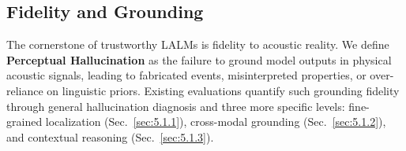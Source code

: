 \documentclass{llmxive}
\begin{document}


\subsection{Fidelity and Grounding}
\label{sec:5.1}

The cornerstone of trustworthy LALMs is fidelity to acoustic reality. We define \textbf{Perceptual Hallucination} as the failure to ground model outputs \cite{cheng2026aha, nwulist2026aabench, nwulist2026speechjailbreaker, zhao2026halluaudiocomprehensivebenchmarkhallucination} in physical acoustic signals, leading to fabricated events, misinterpreted properties, or over-reliance on linguistic priors. Existing evaluations quantify such grounding fidelity through general hallucination diagnosis and three more specific levels: fine-grained localization (Sec.~\ref{sec:5.1.1}), cross-modal grounding (Sec.~\ref{sec:5.1.2}), and contextual reasoning (Sec.~\ref{sec:5.1.3}).
\end{document}
